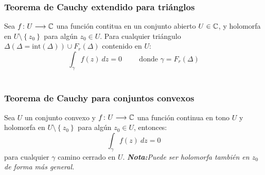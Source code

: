 \documentclass{report}
\begin{document}
{      \subsubsection*{Teorema de Cauchy extendido para triánglos}
        Sea $f\colon U\longrightarrow\mathbb{C}$ una función contitua en un conjunto abierto $U\in\mathbb{C}$,
        y holomorfa en $U\setminus\left\{z_0\right\}$ para algún $z_0\in U$.
        Para cualquier triángulo $\Delta (\Delta=\text{int}(\Delta))\cup F_r(\Delta)$ 
        contenido en $U$:
        \begin{equation}
          \int_\gamma f(z)\ dz=0\hspace{1cm}\text{donde }\gamma=F_r(\Delta)
        \end{equation}\\

      \subsubsection*{Teorema de Cauchy para conjuntos convexos}
        Sea $U$ un conjunto convexo y $f\colon U\longrightarrow\mathbb{C}$ una función continua
        en tono $U$ y holomorfa en $U\setminus\left\{z_0\right\}$ para algún $z_0\in U$, 
        entonces:
        \[\int_\gamma f(z)\ dz=0\]
        para cualquier $\gamma$ camino cerrado en $U$.
        \textit{\textbf{Nota:}Puede ser holomorfa también en $z_0$ de forma más general.}
    }
\end{document}
